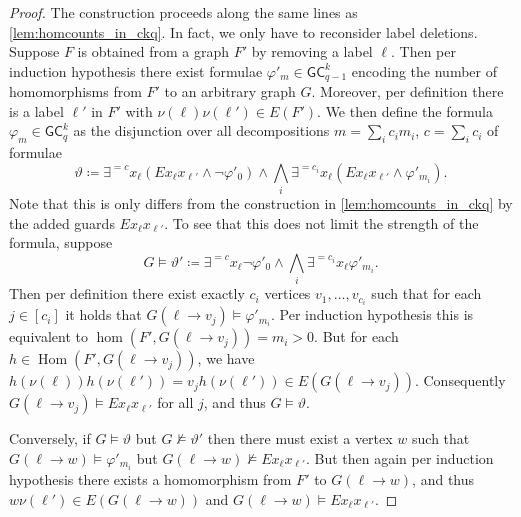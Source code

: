 \documentclass[10pt,a4paper]{article}
\renewcommand{\theta}{\vartheta}
\newcommand{\lGC}{\ensuremath{\mathsf{GC}}}
\DeclareMathOperator{\HOM}{Hom}
\begin{document}
  \gcHomcap*

    \begin{proof}
    The construction proceeds along the same lines as \cref{lem:homcounts_in_ckq}. In fact, we only have to reconsider label deletions. Suppose $F$ is obtained from a graph $F'$ by removing a label $\ell$. Then per induction hypothesis there exist formulae $\varphi'_m \in \mathsf{GC}_{q-1}^k$ encoding the number of homomorphisms from $F'$ to an arbitrary graph $G$. Moreover, per definition there is a label $\ell'$ in $F'$ with $\nu(\ell)\nu(\ell') \in E(F')$. We then define the formula $\varphi_m \in \lGC_{q}^k$ as the disjunction over all decompositions $m = \sum_i c_im_i$, $c = \sum_i c_i$ of formulae
    \begin{equation*}
      \theta \coloneqq \exists^{=c}x_\ell (Ex_{\ell}x_{\ell'} \land \neg \varphi'_0) \land \bigwedge_i \exists^{=c_i}x_\ell(Ex_{\ell}x_{\ell'} \land \varphi'_{m_i}).
    \end{equation*}
    Note that this is only differs from the construction in \cref{lem:homcounts_in_ckq} by the added guards $Ex_{\ell}x_{\ell'}$. To see that this does not limit the strength of the formula, suppose
    \begin{equation*}
      G \models \theta' \coloneqq \exists^{=c}x_\ell \neg \varphi'_0 \land \bigwedge_i \exists^{=c_i}x_\ell\varphi'_{m_i}.
    \end{equation*}
    Then per definition there exist exactly $c_i$ vertices $v_1, \dots, v_{c_i}$ such that for each $j \in [c_i]$ it holds that $G(\ell \to v_j) \models \varphi'_{m_i}$. Per induction hypothesis this is equivalent to $\hom(F', G(\ell \to v_j)) = m_i > 0$. But for each $h \in \HOM(F', G(\ell \to v_j))$, we have $h(\nu(\ell))h(\nu(\ell')) = v_jh(\nu(\ell')) \in E(G(\ell \to v_j))$. Consequently $G(\ell \to v_j) \models Ex_{\ell}x_{\ell'}$ for all $j$, and thus $G \models \theta$.

    Conversely, if $G \models \theta$ but $G \not\models \theta'$ then there must exist a vertex $w$ such that $G(\ell \to w) \models \varphi'_{m_i}$ but $G(\ell \to w) \not\models Ex_{\ell}x_{\ell'}$. But then again per induction hypothesis there exists a homomorphism from $F'$ to $G(\ell \to w)$, and thus $w\nu(\ell') \in E(G(\ell \to w))$ and $G(\ell \to w) \models Ex_{\ell}x_{\ell'}$.
  \end{proof}

  \qgFromGckq*
\end{document}
